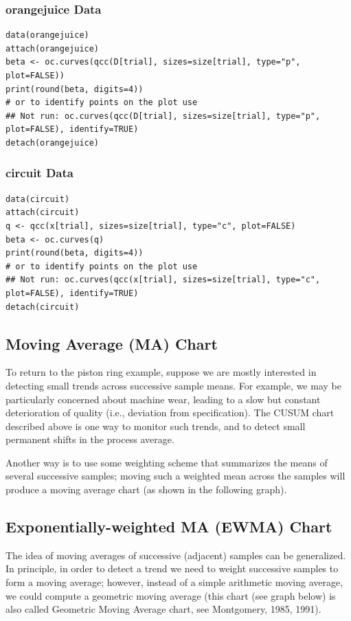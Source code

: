 \documentclass[]{article}
\begin{document}
\newpage
\subsubsection{orangejuice Data}
\begin{framed}
\begin{verbatim}
data(orangejuice)
attach(orangejuice)
beta <- oc.curves(qcc(D[trial], sizes=size[trial], type="p", plot=FALSE))
print(round(beta, digits=4))
# or to identify points on the plot use
## Not run: oc.curves(qcc(D[trial], sizes=size[trial], type="p", plot=FALSE), identify=TRUE)
detach(orangejuice)
\end{verbatim}
\end{framed}
\newpage
\subsubsection{circuit Data}
\begin{framed}
\begin{verbatim}
data(circuit)
attach(circuit)
q <- qcc(x[trial], sizes=size[trial], type="c", plot=FALSE)
beta <- oc.curves(q)
print(round(beta, digits=4))
# or to identify points on the plot use
## Not run: oc.curves(qcc(x[trial], sizes=size[trial], type="c", plot=FALSE), identify=TRUE)
detach(circuit)
\end{verbatim}
\end{framed}
\newpage
\subsection{Moving Average (MA) Chart}
To return to the piston ring example, suppose we are mostly interested in detecting small trends across successive sample means. For example, we may be particularly concerned about machine wear, leading to a slow but constant deterioration of quality (i.e., deviation from specification). The CUSUM chart described above is one way to monitor such trends, and to detect small permanent shifts in the process average. 

Another way is to use some weighting scheme that summarizes the means of several successive samples; moving such a weighted mean across the samples will produce a moving average chart (as shown in the following graph).



\subsection{Exponentially-weighted MA (EWMA) Chart}
The idea of moving averages of successive (adjacent) samples can be generalized. In principle, in order to detect a trend we need to weight successive samples to form a moving average; however, instead of a simple arithmetic moving average, we could compute a geometric moving average (this chart (see graph below) is also called Geometric Moving Average chart, see Montgomery, 1985, 1991).
\newpage
\end{document}
